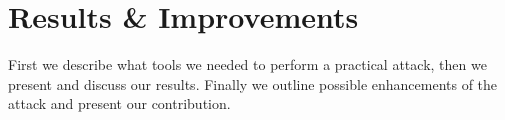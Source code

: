 \chapter{Results \& Improvements}
\label{chap:results}

First we describe what tools we needed to perform a practical attack, then we present and discuss our results. Finally we outline possible enhancements of the attack and present our contribution.







